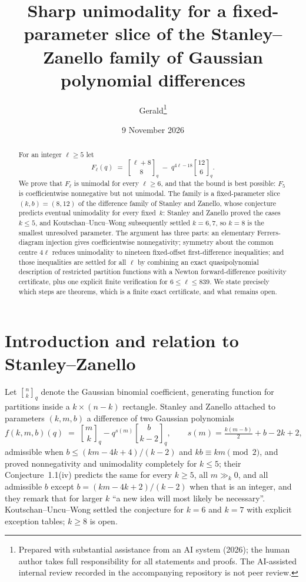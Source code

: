 \documentclass[11pt]{article}
\title{\bf Sharp unimodality for a fixed-parameter slice of the Stanley--Zanello family of
Gaussian polynomial differences}
\author{Gerald\thanks{Prepared with substantial assistance from an AI system (2026);
the human author takes full responsibility for all statements and proofs. The
AI-assisted internal review recorded in the accompanying repository is not peer review.}}
\date{9 November 2026}
\theoremstyle{definition}
\newcommand{\gauss}[2]{\genfrac{[}{]}{0pt}{0}{#1}{#2}_q}
\begin{document}
\maketitle

\begin{abstract}
For an integer $\ell \ge 5$ let
\[
  F_\ell(q)\;=\;\gauss{\ell+8}{8}\;-\;q^{4\ell-18}\gauss{12}{6}.
\]
We prove that $F_\ell$ is unimodal for every $\ell \ge 6$, and that the bound is best possible:
$F_5$ is coefficientwise nonnegative but not unimodal. The family is a fixed-parameter slice
$(k,b)=(8,12)$ of the difference family of Stanley and Zanello, whose conjecture predicts
eventual unimodality for every fixed~$k$: Stanley and Zanello proved the cases $k\le5$, and
Koutschan--Uncu--Wong subsequently settled $k=6,7$, so $k=8$ is the smallest unresolved
parameter. The argument has three parts: an elementary
Ferrers-diagram injection gives coefficientwise nonnegativity; symmetry about the common centre
$4\ell$ reduces unimodality to nineteen fixed-offset first-difference inequalities; and those
inequalities are settled for all $\ell$ by combining an exact quasipolynomial description of
restricted partition functions with a Newton forward-difference positivity certificate, plus one
explicit finite verification for $6\le\ell\le 839$. We state precisely which steps are theorems,
which is a finite exact certificate, and what remains open.
\end{abstract}

\section{Introduction and relation to Stanley--Zanello}

Let $\gauss{n}{k}$ denote the Gaussian binomial coefficient, generating function for partitions
inside a $k\times(n-k)$ rectangle. Stanley and Zanello \cite{sz} attached to parameters
$(k,m,b)$ a difference of two Gaussian polynomials
\[
  f(k,m,b)(q)\;=\;\gauss{m}{k}-q^{s(m)}\gauss{b}{k-2},\qquad
  s(m)=\tfrac{k(m-b)}{2}+b-2k+2,
\]
admissible when $b\le(km-4k+4)/(k-2)$ and $kb\equiv km\pmod 2$, and proved nonnegativity and
unimodality completely for $k\le 5$; their Conjecture~1.1(iv) predicts the same for every $k\ge5$,
all $m\gg_k0$, and all admissible $b$ except $b=(km-4k+2)/(k-2)$ when that is an integer, and they
remark that for larger $k$ ``a new idea will most likely be necessary''. Koutschan--Uncu--Wong
\cite{kuw} settled the conjecture for $k=6$ and $k=7$ with explicit exception tables; $k\ge8$ is
open.
\end{document}
